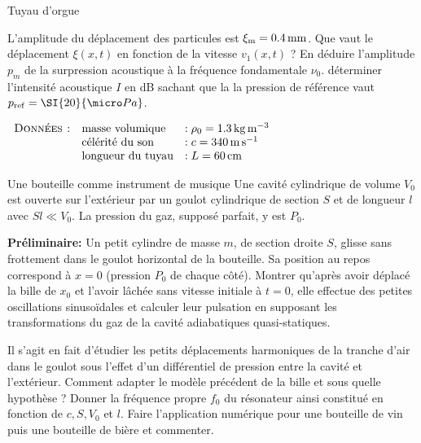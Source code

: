 \begin{exo}[PSI][1][TD]{Tuyau d'orgue}
\begin{quest}
\item L'amplitude du déplacement des particules est $\xi_{\rm m} = \SI{0.4}{mm}$. Que vaut le déplacement $\xi(x,t)$ en fonction de la vitesse $v_1(x,t)$ ? En
déduire l'amplitude $p_m$ de la surpression acoustique à la fréquence fondamentale $\nu_0$. \AN déterminer l'intensité acoustique $I$ en dB sachant que la la pression de référence vaut $p_{\rm ref}=\SI{20}{\micro Pa}$.

\end{quest}

 $\begin{array}{lll}
\textsc{Données :}
& \text{masse volumique} & :  \rho_0 = \SI{1.3}{kg.m^{-3}} \\
& \text{célérité du son} & : c = \SI{340}{m.s^{-1}} \\
& \text{longueur du tuyau} & : L=\SI{60}{cm}
\end{array}
$

\end{exo}

\begin{exo}[PC]{Une bouteille comme instrument de musique}
Une cavité cylindrique de volume $V_0$ est ouverte sur l'extérieur par un goulot cylindrique de section $S$ et de longueur $l$ avec $Sl\ll V_0$.  La pression du gaz, supposé parfait, y est $P_0$.
\begin{quest}
\item \textbf{Préliminaire:} Un petit cylindre de masse $m$, de section droite $S$, glisse sans frottement dans le goulot horizontal de la bouteille. Sa position au repos correspond à $x=0$ (pression $P_0$ de chaque côté). Montrer qu'après avoir déplacé la bille de $x_0$ et l'avoir lâchée sans vitesse initiale à $t=0$, elle effectue des petites oscillations sinusoïdales et calculer leur pulsation en supposant les transformations du gaz de la cavité adiabatiques quasi-statiques.
\item Il s'agit en fait d'étudier les petits déplacements harmoniques de la tranche d'air dans le goulot sous l'effet d'un différentiel de pression entre la cavité et l'extérieur. Comment adapter le modèle précédent de la bille et sous quelle hypothèse ? Donner la fréquence propre $f_0$ du résonateur ainsi constitué en fonction de $c,S,V_0$ et $l$. Faire l'application numérique pour une bouteille de vin puis une bouteille de bière et commenter.
\end{quest}
\end{exo}

